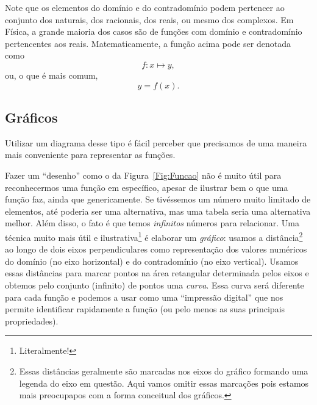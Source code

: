 Note que os elementos do domínio e do contradomínio podem pertencer ao conjunto dos naturais, dos racionais, dos reais, ou mesmo dos complexos. Em Física, a grande maioria dos casos são de funções com domínio e contradomínio pertencentes aos reais. Matematicamente, a função acima pode ser denotada como
\begin{equation}
    f: x \mapsto y,
\end{equation}
%
ou, o que é mais comum,
\begin{equation}
    y = f(x).
\end{equation}

\subsection{Gráficos}

\begin{marginfigure}[-1cm]
\centering
{}
\caption{Utilizar um diagrama desse tipo é fácil perceber que precisamos de uma maneira mais conveniente para representar as funções.}
\end{marginfigure}

Fazer um ``desenho'' como o da Figura~\ref{Fig:Funcao} não é muito útil para reconhecermos uma função em específico, apesar de ilustrar bem o que uma função faz, ainda que genericamente. Se tivéssemos um número muito limitado de elementos, até poderia ser uma alternativa, mas uma tabela seria uma alternativa melhor. Além disso, o fato é que temos \emph{infinitos} números para relacionar. Uma técnica muito mais útil e ilustrativa\footnote[][0.5cm]{Literalmente!} é elaborar um \emph{gráfico}: usamos a distância\footnote{Essas distâncias geralmente são marcadas nos eixos do gráfico formando uma legenda do eixo em questão. Aqui vamos omitir essas marcações pois estamos mais preocupapos com a forma conceitual dos gráficos.} ao longo de dois eixos perpendiculares como representação dos valores numéricos do domínio (no eixo horizontal) e do contradomínio (no eixo vertical). Usamos essas distâncias para marcar pontos na área retangular determinada pelos eixos e obtemos pelo conjunto (infinito) de pontos uma \emph{curva}. Essa curva será diferente para cada função e podemos a usar como uma ``impressão digital'' que nos permite identificar rapidamente a função (ou pelo menos as suas principais propriedades).

